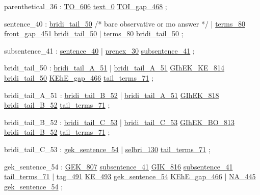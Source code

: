 \label{html:y36}
parenthetical_36        :  \hyperref[html:y606]{TO_606}  \hyperref[html:y0]{text_0}  \hyperref[html:y468]{TOI_gap_468}
                        ;

\label{html:y40}
sentence_40             :  \hyperref[html:y50]{bridi_tail_50}  /* bare observative or mo answer */
                        |  \hyperref[html:y80]{terms_80}  \hyperref[html:y451]{front_gap_451}  \hyperref[html:y50]{bridi_tail_50}
                        |  \hyperref[html:y80]{terms_80}  \hyperref[html:y50]{bridi_tail_50}
                        ;

\label{html:y41}
subsentence_41          :  \hyperref[html:y40]{sentence_40}
                        |  \hyperref[html:y30]{prenex_30}  \hyperref[html:y41]{subsentence_41}
                        ;

\label{html:y50}
bridi_tail_50           :  \hyperref[html:y51]{bridi_tail_A_51}
                        |  \hyperref[html:y51]{bridi_tail_A_51}  \hyperref[html:y814]{GIhEK_KE_814}  \hyperref[html:y50]{bridi_tail_50}
                                  \hyperref[html:y466]{KEhE_gap_466}  \hyperref[html:y71]{tail_terms_71}
                        ;

\label{html:y51}
bridi_tail_A_51         :  \hyperref[html:y52]{bridi_tail_B_52}
                        |  \hyperref[html:y51]{bridi_tail_A_51}  \hyperref[html:y818]{GIhEK_818}  \hyperref[html:y52]{bridi_tail_B_52}
                           \hyperref[html:y71]{tail_terms_71}
                        ;

\label{html:y52}
bridi_tail_B_52         :  \hyperref[html:y53]{bridi_tail_C_53}
                        |  \hyperref[html:y53]{bridi_tail_C_53}  \hyperref[html:y813]{GIhEK_BO_813}  \hyperref[html:y52]{bridi_tail_B_52}
                           \hyperref[html:y71]{tail_terms_71}
                        ;

\label{html:y53}
bridi_tail_C_53         :  \hyperref[html:y54]{gek_sentence_54}
                        |  \hyperref[html:y130]{selbri_130}  \hyperref[html:y71]{tail_terms_71}
                        ;

\label{html:y54}
gek_sentence_54         :  \hyperref[html:y807]{GEK_807}  \hyperref[html:y41]{subsentence_41}
                                \hyperref[html:y816]{GIK_816}  \hyperref[html:y41]{subsentence_41}  \hyperref[html:y71]{tail_terms_71}
                        |  \hyperref[html:y491]{tag_491}  \hyperref[html:y493]{KE_493}  \hyperref[html:y54]{gek_sentence_54}  \hyperref[html:y466]{KEhE_gap_466}
                        |  \hyperref[html:y445]{NA_445}  \hyperref[html:y54]{gek_sentence_54}
                        ;

